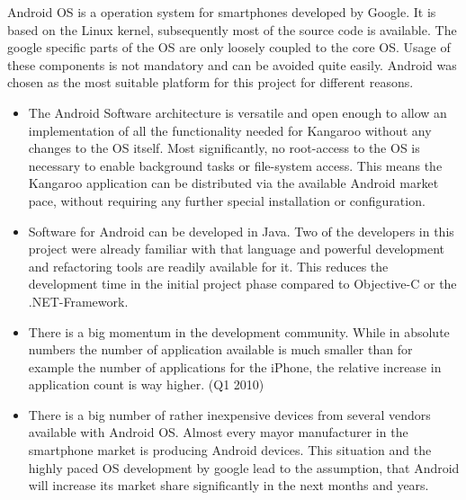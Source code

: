 Android OS is a operation system for smartphones  developed by Google. It is based on the Linux kernel, subsequently most of the source code is available. The google specific parts of the OS are only loosely coupled to the core OS. Usage of these components is not mandatory and can be avoided quite easily. Android was chosen as the most suitable platform for this project for different reasons.
\begin{itemize}
\item The Android Software architecture is versatile and open enough to allow an implementation of all the functionality needed for Kangaroo without any changes to the OS itself. Most significantly, no root-access to the OS is necessary to enable background tasks or file-system access. This means the Kangaroo application can be distributed via the available Android market pace, without requiring any further special installation or configuration.
\item Software for Android can be developed in Java. Two of the developers in this project were already familiar with that language and powerful development and refactoring tools are readily available for it. This reduces the development time in the initial project phase compared to Objective-C or the .NET-Framework.   
\item There is a big momentum in the development community. While in absolute numbers the number of application available is much smaller than for example the number of applications for the iPhone, the relative increase in application count is way higher. (Q1 2010) 
\item There is a big number of rather inexpensive devices from several vendors available with Android OS. Almost every mayor manufacturer in the smartphone market is producing Android devices. This situation and the highly paced OS development by google lead to the assumption, that Android will increase its market share significantly in the next months and years.
\end{itemize}
